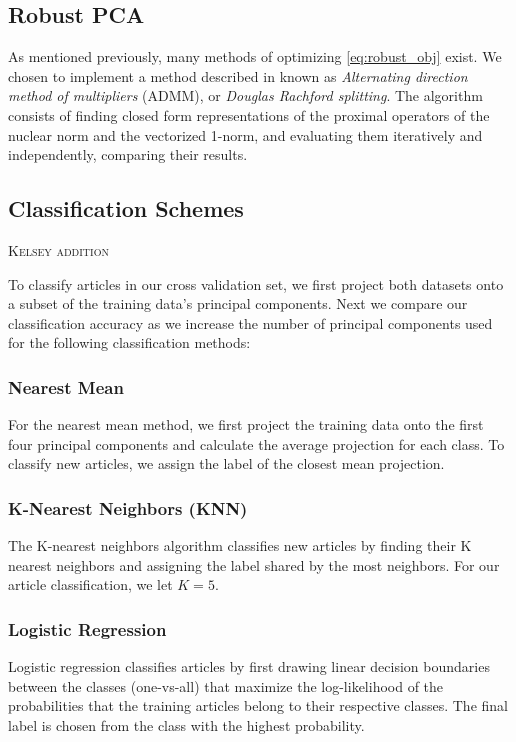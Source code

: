 \documentclass[12pt]{article}
\newcommand{\comment}[1]{\textsc{\color[rgb]{1,0,0}#1}}
\begin{document}
\subsection{Robust PCA}
As mentioned previously, many methods of optimizing \eqref{eq:robust_obj} exist. We chosen to implement a method described in \cite{prox} known as \emph{Alternating direction method of multipliers} (ADMM), or \emph{Douglas Rachford splitting}. The algorithm consists of finding closed form representations of the proximal operators of the nuclear norm and the vectorized 1-norm, and evaluating them iteratively and independently, comparing their results.  

\subsection{Classification Schemes}
\comment{Kelsey addition}

To classify articles in our cross validation set, we first project both datasets onto a subset of the training data’s principal components. Next we compare our classification accuracy as we increase the number of principal components used for the following classification methods:

\subsubsection{Nearest Mean}

For the nearest mean method, we first project the training data onto
the first four principal components and calculate the average projection for each class. To classify new articles, we assign the label of the closest mean projection.

\subsubsection{K-Nearest Neighbors (KNN)}

The K-nearest neighbors algorithm classifies new articles by
finding their K nearest neighbors and assigning the label shared by the most neighbors. For our article classification, we let $K = 5$.

\subsubsection{Logistic Regression}

Logistic regression classifies articles by first drawing linear decision
boundaries between the classes (one-vs-all) that maximize the log-likelihood of the probabilities that the training articles belong to their respective classes. The final label is chosen from the class with the highest probability.
\end{document}
